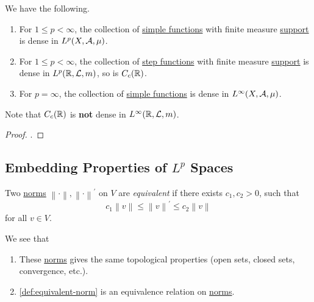 \begin{proposition}
	We have the following.
	\begin{enumerate}
		\item For \(1\leq p< \infty \), the collection of \hyperref[def:simple-function]{simple functions} with finite measure
		      \hyperref[def:support]{support} is dense in \(L^p(X, \mathcal{\MakeUppercase{a}} , \mu )\).
		\item For \(1\leq p<\infty \), the collection of \hyperref[def:step-function]{step functions} with finite measure
		      \hyperref[def:support]{support} is dense in \(L^p(\mathbb{\MakeUppercase{r}} , \mathcal{\MakeUppercase{l}} , m)\), so is \(C_c(\mathbb{\MakeUppercase{r}} )\).
		\item For \(p = \infty \), the collection of \hyperref[def:simple-function]{simple functions} is dense in \(L^{\infty} (X, \mathcal{\MakeUppercase{a}} , \mu )\).
	\end{enumerate}
\end{proposition}
\begin{remark}
	Note that \(C_c(\mathbb{\MakeUppercase{r}} )\) is \textbf{not} dense in \(L^{\infty} (\mathbb{\MakeUppercase{r}} , \mathcal{\MakeUppercase{l}} , m)\).
\end{remark}
\begin{proof}
	.
\end{proof}

\subsection{Embedding Properties of \(L^p\) Spaces}
\begin{definition}\label{def:equivalent-norm}
	Two \hyperref[def:norm]{norms} \(\left\lVert \cdot\right\rVert, \left\lVert \cdot\right\rVert ^\prime  \) on \(V\) are \emph{equivalent} if there exists \(c_1, c_2>0\), such that
	\[
		c_1 \left\lVert v\right\rVert \leq \left\lVert v\right\rVert ^\prime \leq c_2 \left\lVert v\right\rVert
	\]
	for all \(v\in V\).
\end{definition}
\begin{note}
	We see that
	\begin{enumerate}
		\item These \hyperref[def:norm]{norms} gives the same topological properties (open sets, closed sets, convergence, etc.).
		\item \autoref{def:equivalent-norm} is an equivalence relation on \hyperref[def:norm]{norms}.
	\end{enumerate}
\end{note}

